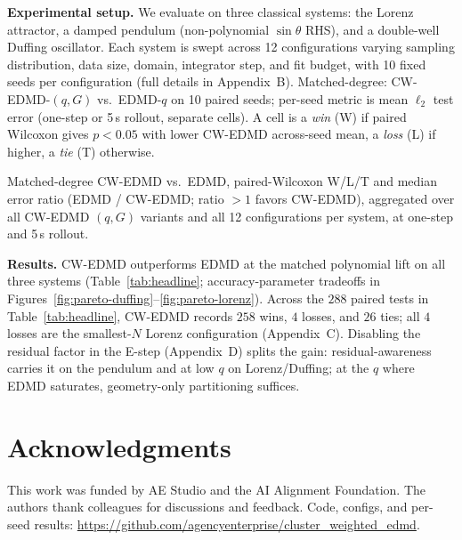 \documentclass{article}
\begin{document}
\begin{multicols}{2}
\textbf{Experimental setup.} We evaluate on three classical systems: the Lorenz attractor, a damped pendulum (non-polynomial $\sin\theta$ RHS), and a double-well Duffing oscillator. Each system is swept across 12 configurations varying sampling distribution, data size, domain, integrator step, and fit budget, with 10 fixed seeds per configuration (full details in Appendix~B). Matched-degree: CW-EDMD-$(q,G)$ vs.\ EDMD-$q$ on 10 paired seeds; per-seed metric is mean $\ell_2$ test error (one-step or 5\,s rollout, separate cells). A cell is a \emph{win} (W) if paired Wilcoxon gives $p<0.05$ with lower CW-EDMD across-seed mean, a \emph{loss} (L) if higher, a \emph{tie} (T) otherwise.

\begin{table}[H]
\caption{Matched-degree CW-EDMD vs.\ EDMD, paired-Wilcoxon W/L/T and median error ratio (EDMD / CW-EDMD; ratio $>1$ favors CW-EDMD), aggregated over all CW-EDMD $(q, G)$ variants and all 12 configurations per system, at one-step and 5\,s rollout.}
\label{tab:headline}
\centering\footnotesize
\setlength{\tabcolsep}{3pt}

\end{table}

\noindent\textbf{Results.} CW-EDMD outperforms EDMD at the matched polynomial lift on all three systems (Table~\ref{tab:headline}; accuracy-parameter tradeoffs in Figures~\ref{fig:pareto-duffing}--\ref{fig:pareto-lorenz}). Across the $288$ paired tests in Table~\ref{tab:headline}, CW-EDMD records $258$ wins, $4$ losses, and $26$ ties; all $4$ losses are the smallest-$N$ Lorenz configuration (Appendix~C). Disabling the residual factor in the E-step (Appendix~D) splits the gain: residual-awareness carries it on the pendulum and at low $q$ on Lorenz/Duffing; at the $q$ where EDMD saturates, geometry-only partitioning suffices.

\section*{Acknowledgments}
This work was funded by AE Studio and the AI Alignment Foundation. The authors thank colleagues for discussions and feedback. Code, configs, and per-seed results: \url{https://github.com/agencyenterprise/cluster_weighted_edmd}.




\end{multicols}
\end{document}
